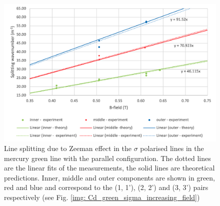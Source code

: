 \documentclass[11pt]{article}
\begin{document}
\begin{figure}[h!]
    \centering
    \includegraphics[width=0.9\linewidth]{Hg green sigma par graph.png}
    \captionsetup{width=\linewidth}
    \captionsetup{justification=centering}
    \caption{Line splitting due to Zeeman effect in the $\sigma$ polarised lines in the mercury green line with the parallel configuration. The dotted lines are the linear fits of the measurements, the solid lines are theoretical predictions. Inner, middle and outer components are shown in green, red and blue and correspond to the (1, 1'), (2, 2') and (3, 3') pairs respectively (see Fig. \ref{img: Cd_green_sigma_increasing_field})}
    \label{fig: Hg green sigma}
\end{figure}
\end{document}
